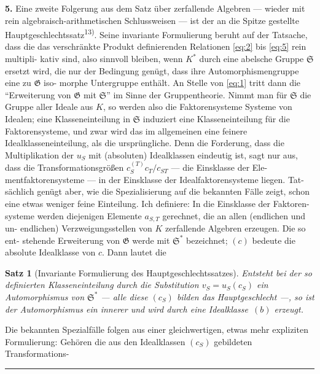 \documentclass[12pt,a4paper]{article}
\theoremstyle{plain}
\newtheorem*{satz}{Satz}
\newcommand{\Ga}{\mathfrak{G}}
\newcommand{\setA}{\mathfrak{S}}
\begin{document}
\smallskip
\noindent\textbf{5.}\hspace{0.5em}%
Eine zweite Folgerung aus dem Satz \"uber zerfallende Algebren --- wieder mit
rein algebraisch-arithmetischen Schlussweisen --- ist der an die Spitze gestellte
Hauptgeschlechtssatz\textsuperscript{13)}. Seine invariante Formulierung beruht auf der Tatsache,
dass die das verschr\"ankte Produkt definierenden Relationen \eqref{eq:2} bis \eqref{eq:5} rein multipli-
kativ sind, also sinnvoll bleiben, wenn $K^*$ durch eine abelsche Gruppe $\setA$ ersetzt wird,
die nur der Bedingung gen\"ugt, dass ihre Automorphismengruppe eine zu $\Ga$ iso-
morphe Untergruppe enth\"alt. An Stelle von \eqref{eq:1} tritt dann die ``Erweiterung von $\Ga$
mit $\setA$'' im Sinne der Gruppentheorie. Nimmt man f\"ur $\setA$ die Gruppe aller Ideale aus
$K$, so werden also die Faktorensysteme Systeme von Idealen; eine Klasseneinteilung
in $\setA$ induziert eine Klasseneinteilung f\"ur die Faktorensysteme, und zwar wird das im
allgemeinen eine feinere Idealklasseneinteilung, als die urspr\"ungliche. Denn die
Forderung, dass die Multiplikation der $u_S$ mit (absoluten) Idealklassen eindeutig ist,
sagt nur aus, dass die Transformationsgr\"o\ss en $c_S^{(T)} c_T/c_{ST}$ --- die Einsklasse der Ele-
mentfaktorensysteme --- in der Einsklasse der Idealfaktorensysteme liegen. Tat-
s\"achlich gen\"ugt aber, wie die Spezialisierung auf die bekannten F\"alle zeigt, schon
eine etwas weniger feine Einteilung. Ich definiere: In die Einsklasse der Faktoren-
systeme werden diejenigen Elemente $a_{S,T}$ gerechnet, die an allen (endlichen und un-
endlichen) Verzweigungsstellen von $K$ zerfallende Algebren erzeugen. Die so ent-
stehende Erweiterung von $\Ga$ werde mit $\setA^*$ bezeichnet; $(c)$ bedeute die absolute
Idealklasse von $c$. Dann lautet die

\smallskip
\begin{satz}[Invariante Formulierung des Hauptgeschlechtssatzes]
Entsteht bei der so definierten Klasseneinteilung durch die Substitution
$v_S = u_S (c_S)$ ein Automorphismus von $\setA^*$ --- alle diese $(c_S)$ bilden das Hauptgeschlecht ---,
so ist der Automorphismus ein innerer und wird durch eine Idealklasse~$(b)$ erzeugt.
\end{satz}

\smallskip
\noindent
Die bekannten Spezialf\"alle folgen aus einer gleichwertigen, etwas mehr expliziten
Formulierung: Geh\"oren die aus den Idealklassen $(c_S)$ gebildeten Transformations-

\bigskip
\noindent\rule{0.3\textwidth}{0.4pt}
\end{document}
